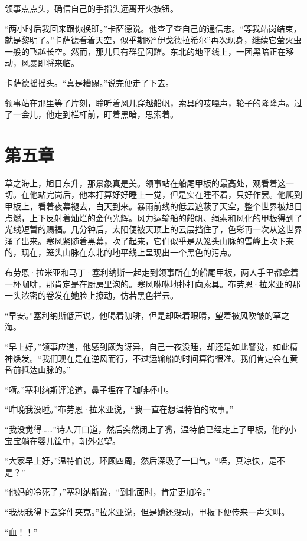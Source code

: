 \documentclass[AutoFakeBold=true]{book}
\begin{document}
领事点点头，确信自己的手指头远离开火按钮。

``两小时后我回来跟你换班。''卡萨德说。他查了查自己的通信志。``等我站岗结束，就是黎明了。''卡萨德看着天空，似乎期盼``伊戈德拉希尔''再次现身，继续它萤火虫一般的飞越长空。然而，那儿只有群星闪耀。东北的地平线上，一团黑暗正在移动，风暴即将来临。

卡萨德摇摇头。``真是糟蹋。''说完便走了下去。

领事站在那里等了片刻，聆听着风儿穿越船帆，索具的吱嘎声，轮子的隆隆声。过了一会儿，他走到栏杆前，盯着黑暗，思索着。

\chapter{第五章}

草之海上，旭日东升，那景象真是美。领事站在船尾甲板的最高处，观看着这一切。在他站完岗后，他本打算好好睡上一觉，但是实在睡不着，只好作罢。他爬到甲板上，看着夜幕褪去，白天到来。暴雨前线的低云遮蔽了天空，整个世界被旭日点燃，上下反射着灿烂的金色光辉。风力运输船的船帆、绳索和风化的甲板得到了光线短暂的赐福。几分钟后，太阳便被天顶上的云层挡住了，色彩再一次从这世界涌了出来。寒风紧随着黑幕，吹了起来，它们似乎是从笼头山脉的雪峰上吹下来的，现在，笼头山脉在东北的地平线上呈现出一个黑色的污点。

布劳恩·拉米亚和马丁·塞利纳斯一起走到领事所在的船尾甲板，两人手里都拿着一杯咖啡，那肯定是在厨房里泡的。寒风咻咻地扑打向索具。布劳恩·拉米亚的那一头浓密的卷发在她脸上撩动，仿若黑色祥云。

``早安。''塞利纳斯低声说，他喝着咖啡，但是却眯着眼睛，望着被风吹皱的草之海。

``早上好，''领事应道，他感到颇为讶异，自己一夜没睡，却还是如此警觉，如此精神焕发。``我们现在是在逆风而行，不过运输船的时间算得很准。我们肯定会在黄昏前抵达山脉的。''

``嗬。''塞利纳斯评论道，鼻子埋在了咖啡杯中。

``昨晚我没睡。''布劳恩·拉米亚说，``我一直在想温特伯的故事。''

``我没觉得……''诗人开口道，然后突然闭上了嘴，温特伯已经走上了甲板，他的小宝宝躺在婴儿筐中，朝外张望。

``大家早上好，''温特伯说，环顾四周，然后深吸了一口气，``唔，真凉快，是不是？''

``他妈的冷死了，''塞利纳斯说，``到北面时，肯定更加冷。''

``我想我得下去穿件夹克。''拉米亚说，但是她还没动，甲板下便传来一声尖叫。

``血！！''
\end{document}
